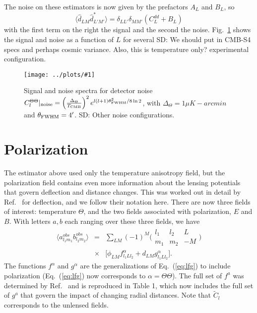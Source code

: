 \documentclass[prl,amsmath,amssymb,floatfix,superscriptaddress,nofootinbib,twocolumn]{revtex4-1}
\def\be{\begin{equation}}
\def\ee{\end{equation}}
\def\bea{\begin{eqnarray}}
\def\eea{\end{eqnarray}}
\newcommand{\ec}[1]{Eq.~(\ref{eq:#1})}
\newcommand{\sfig}[2]{
\texttt{[image: ../plots/\#1]}
        }
\newcommand{\Spng}[2]{
   \begin{figure}[thbp]
   \begin{center}
    \sfig{#1.png}{\columnwidth}
    \caption{{\small #2}}
    \label{fig:#1}
     \end{center}
   \end{figure}
}
\newcommand{\rf}[1]{\ref{fig:#1}}
\newcommand{\scott}[1]{{\color{darkgreen} SD: #1}}
\begin{document}
The noise on these estimators is now given by the prefactors $A_L$ and $B_L$, so  
\be
\langle \hat d_{LM} \hat d^*_{L'M'}  \rangle = \delta_{LL'}\delta_{MM'} \left( C_L^{dd} + B_L \right)
\ee
with the first term on the right the signal and the second the noise. Fig.~\rf{Delay} shows the signal and noise as a function of $L$ for several \scott{We should put in CMB-S4 specs and perhaps cosmic variance. Also, this is temperature only?} experimental configuration.
\Spng{Delay}{Signal and noise spectra for detector noise $C_{l}^{\Theta \Theta}|_{\rm noise} = \left(\frac{\Delta_{\Theta}}{T_{\rm CMB}} \right)^{2} e^{l(l+1)\theta_{\rm FWHM}^{2}/8 \, \rm ln \,2}$, with $\Delta_{\Theta}=1\mu K-arcmin$ and $\theta_{\rm FWHM}=4'$. \scott{Other noise configurations.}}

\section{Polarization}

The estimator above used only the temperature anisotropy field, but the polarization field contains even more information about the lensing potentials that govern deflection and distance changes. This was worked out in detail by Ref.~\cite{Okamoto:2003zw} for deflection, and we follow their notation here. There are now three fields of interest: temperature $\Theta$, and the two fields associated with polarization, $E$ and $B$. With letters $a,b$ each ranging over these three fields, we have 
\bea
\langle a^{obs}_{l_{1}m_{1}}b^{obs}_{l_{2}m_{2}}\rangle &=& \sum_{LM}(-1)^{M}\bigl(\begin{smallmatrix} l_1 & l_2 & L \\ m_1 & m_2 & -M  \end{smallmatrix}\bigr)\nonumber \\
&\times&
\big[ \phi_{LM}f^{\alpha}_{l_{1}Ll_{2}} + d_{LM}g^{\alpha}_{l_{1}Ll_{2}} \big] 
.\eea
The functions $f^\alpha$ and $g^\alpha$ are the generalizations of \ec{lfg} to include polarization (\ec{lfg} now corresponds to $\alpha=\Theta\Theta$). The full set of $f^a$ was determined by Ref.~\cite{Okamoto:2003zw} and is reproduced in Table 1, which now includes the full set of $g^a$ that govern the impact of changing radial distances. Note that $\tilde C_l$ corresponds to the unlensed fields.
\end{document}
